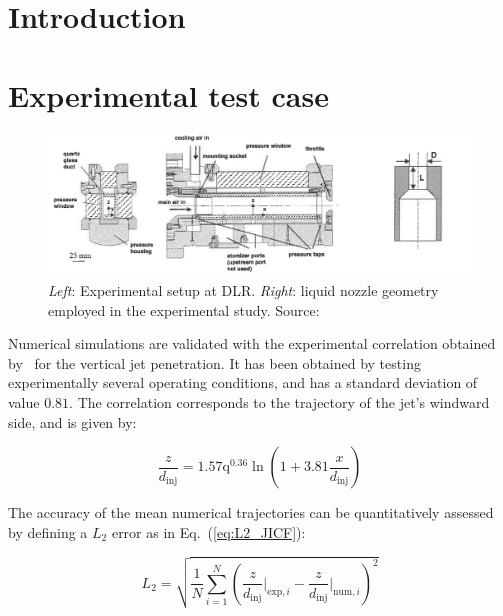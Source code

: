 \newpage 

\section{Introduction}



\section{Experimental test case}

\begin{figure}[h!]
	\centering
	\includegraphics[scale=0.5]{./part2_developments/figures_ch5_resolved_JICF/experiment_JICF_DLR}
	\caption{\textsl{Left}: Experimental setup at DLR. \textsl{Right}: liquid nozzle geometry employed in the experimental study. Source: }
	\label{fig:experiment_JICF_DLR}
\end{figure}

Numerical simulations are validated with the experimental correlation obtained by~\cite{ref:Becker2002} for the vertical jet penetration. It has been obtained by testing experimentally several operating conditions, and has a standard deviation of value $0.81$. The correlation corresponds to the trajectory of the jet's windward side, and is given by:

\begin{equation}
    \label{eq:jicf_trajectory_becker}
    \frac{z}{d_\mathrm{inj}} = 1.57 \mathrm{q}^{0.36} \ln \left( 1 + 3.81 \frac{x}{d_\mathrm{inj}} \right)
\end{equation}

The accuracy of the mean numerical trajectories can be quantitatively assessed by defining a $L_2$ error as in Eq.~(\ref{eq:L2_JICF}): 

\begin{equation}
\label{eq:L2_JICF}
    L_2 = \sqrt{\frac{1}{N}   \sum_{i=1}^N \left( \frac{z}{d_\mathrm{inj}} \Bigr|_{\mathrm{exp},i} -   \frac{z}{d_\mathrm{inj}} \Bigr|_{\mathrm{num},i} \right)^2}
\end{equation}

